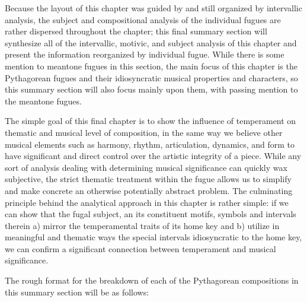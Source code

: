 Because the layout of this chapter was guided by and still organized by
intervallic analysis, the subject and compositional analysis of the
individual fugues are rather dispersed throughout the chapter; this
final summary section will synthesize all of the intervallic, motivic,
and subject analysis of this chapter and present the information
reorganized by individual fugue. While there is some mention to meantone
fugues in this section, the main focus of this chapter is the
Pythagorean fugues and their idiosyncratic musical properties and
characters, so this summary section will also focus mainly upon them,
with passing mention to the meantone fugues.

The simple goal of this final chapter is to show the influence of
temperament on thematic and musical level of composition, in the same
way we believe other musical elements such as harmony, rhythm,
articulation, dynamics, and form to have significant and direct control
over the artistic integrity of a piece. While any sort of analysis
dealing with determining musical significance can quickly wax
subjective, the strict thematic treatment within the fugue allows us to
simplify and make concrete an otherwise potentially abstract problem.
The culminating principle behind the analytical approach in this chapter
is rather simple: if we can show that the fugal subject, an its
constituent motifs, symbols and intervals therein a) mirror the
temperamental traits of its home key and b) utilize in meaningful and
thematic ways the special intervals idiosyncratic to the home key, we
can confirm a significant connection between temperament and musical
significance.

The rough format for the breakdown of each of the Pythagorean
compositions in this summary section will be as follows:

